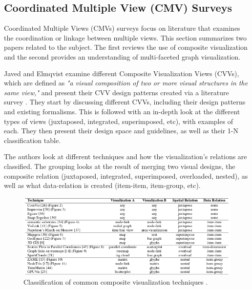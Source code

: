
\subsection{Coordinated Multiple View (CMV) Surveys }
Coordinated Multiple Views (CMVs) surveys focus on literature that examines the coordination or linkage between multiple views. This section summarizes two papers related to the subject. The first reviews the use of composite visualization and the second provides an understanding of multi-faceted graph visualization.

Javed and Elmqvist examine different Composite Visualization Views (CVVs), which are defined as \textit{"a visual composition of two or more visual structures in the same view,"} and present their CVV design patterns created via a literature survey \cite{javed2012exploring}.
They start by discussing different CVVs, including their design patterns  and existing formalisms. This is followed with an in-depth look at the different types of views (juxtaposed, integrated, superimposed, etc), with examples of each. They then present their design space and guidelines, as well as their 1-N classification table.

The authors look at different techniques and how the visualization's relations are classified. The grouping looks at the result of merging two visual designs, the composite relation (juxtaposed, integrated, superimposed, overloaded, nested), as well as what data-relation is created (item-item, item-group, etc).

\begin{figure}[t]
\begin{center}
\includegraphics[width=1\textwidth]{images/javed2012exploring}
\caption{ Classification of common composite visualization techniques \cite{javed2012exploring} .} \label{fig: javed2012exploring}
\end{center}
\end{figure}


